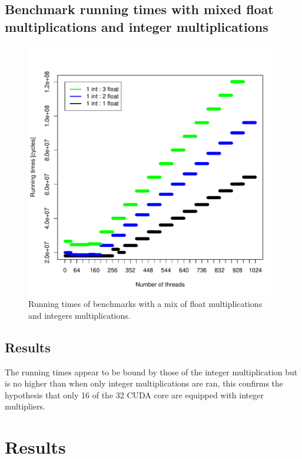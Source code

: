 \documentclass{report}
\def \scalingfactor{.8}
\begin{document}
	\subsection{Benchmark running times with mixed float multiplications and integer multiplications}
	\begin{figure}[H]
		\centering
        \includegraphics[width=\scalingfactor\linewidth]{"graphics/running_times_mixed"}
		\vspace{-15pt}
		\captionsetup{justification=centering}
        \caption{Running times of benchmarks with a mix of float multiplications and integers multiplications.}
    \end{figure}

    \subsection{Results}
    The running times appear to be bound by those of the integer multiplication but is no higher than
    when only integer multiplications are ran, this confirms the hypothesis that only 16 of the 32
    CUDA core are equipped with integer multipliers. 

\section{Results}
\end{document}
